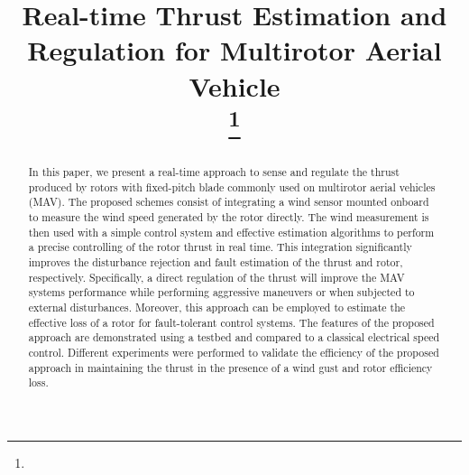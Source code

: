 \documentclass[conference]{IEEEtran}
\begin{document}
\title{Real-time Thrust Estimation and Regulation for Multirotor Aerial Vehicle\\
{}
\thanks{}
}

\author{
\and
{}
\and
{}
\and
{}

}

\maketitle

\begin{abstract}
In this paper, we present a real-time approach to sense and regulate the thrust produced by rotors with fixed-pitch blade commonly used on multirotor aerial vehicles (MAV). The proposed schemes consist of integrating a wind sensor mounted onboard to measure the wind speed generated by the rotor directly. The wind measurement is then used with a simple control system and effective estimation algorithms to perform a precise controlling of the rotor thrust in real time. This integration significantly improves the disturbance rejection and fault estimation of the thrust and rotor, respectively. Specifically, a direct regulation of the thrust will improve the MAV systems performance while performing aggressive maneuvers or when subjected to external disturbances. Moreover, this approach can be employed to estimate the effective loss of a rotor for fault-tolerant control systems. The features of the proposed approach are demonstrated using a testbed and compared to a classical electrical speed control. Different experiments were performed to validate the efficiency of the proposed approach in maintaining the thrust in the presence of a wind gust and rotor efficiency loss.
\end{abstract}
\end{document}
